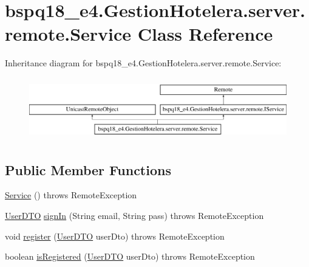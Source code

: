 \hypertarget{classbspq18__e4_1_1_gestion_hotelera_1_1server_1_1remote_1_1_service}{}\section{bspq18\+\_\+e4.\+Gestion\+Hotelera.\+server.\+remote.\+Service Class Reference}
\label{classbspq18__e4_1_1_gestion_hotelera_1_1server_1_1remote_1_1_service}
Inheritance diagram for bspq18\+\_\+e4.\+Gestion\+Hotelera.\+server.\+remote.\+Service\+:\begin{figure}[H]
\begin{center}
\leavevmode
\includegraphics[height=2.718446cm]{classbspq18__e4_1_1_gestion_hotelera_1_1server_1_1remote_1_1_service}
\end{center}
\end{figure}
\subsection*{Public Member Functions}
\begin{DoxyCompactItemize}
\item 
\mbox{\hyperlink{classbspq18__e4_1_1_gestion_hotelera_1_1server_1_1remote_1_1_service_a7be1b25df1d814fc56bd8a19f142a9e8}{Service}} ()  throws Remote\+Exception 
\item 
\mbox{\hyperlink{classbspq18__e4_1_1_gestion_hotelera_1_1server_1_1dto_1_1_user_d_t_o}{User\+D\+TO}} \mbox{\hyperlink{classbspq18__e4_1_1_gestion_hotelera_1_1server_1_1remote_1_1_service_ada202b6aa741a41984d4da00c169b22e}{sign\+In}} (String email, String pass)  throws Remote\+Exception
\item 
void \mbox{\hyperlink{classbspq18__e4_1_1_gestion_hotelera_1_1server_1_1remote_1_1_service_adcb6c2c890c84852528743a2ed77818a}{register}} (\mbox{\hyperlink{classbspq18__e4_1_1_gestion_hotelera_1_1server_1_1dto_1_1_user_d_t_o}{User\+D\+TO}} user\+Dto)  throws Remote\+Exception 
\item 
boolean \mbox{\hyperlink{classbspq18__e4_1_1_gestion_hotelera_1_1server_1_1remote_1_1_service_a2c320a94325708703a401dd2b8b3bfe6}{is\+Registered}} (\mbox{\hyperlink{classbspq18__e4_1_1_gestion_hotelera_1_1server_1_1dto_1_1_user_d_t_o}{User\+D\+TO}} user\+Dto)  throws Remote\+Exception 
\end{DoxyCompactItemize}


